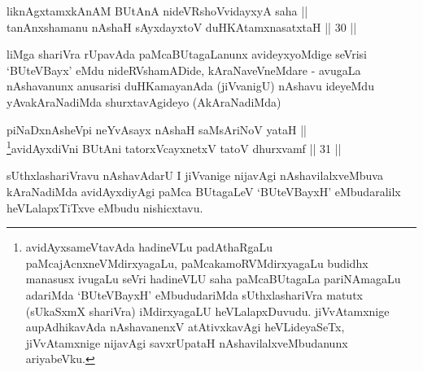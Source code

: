 
\begin{shl}
liknAgxtamxkAnAM BUtAnA nideVRshoV\s vidayxyA saha || \\
tanAnxshamanu nAshaH sAyxdayxtoV duHKAtamxnasatxtaH \hfill || 30 ||
  
\end{shl}

\begin{artha}
liMga shariVra rUpavAda paMcaBUtagaLanunx avideyxyoMdige seVrisi
`BUteVBayx' eMdu nideRVshamADide, kAraNaveVneMdare - avugaLa
nAshavanunx anusarisi duHKamayanAda (jiVvanigU) nAshavu ideyeMdu
yAvakAraNadiMda shurxtavAgideyo (AkAraNadiMda)
\end{artha}


\begin{shl}
piNaDxnAsheV\s pi neYvAsayx nAshaH saMsAriNoV yataH || \\
\footnote{avidAyxsameVtavAda hadineVLu padAthaRgaLu
paMcajAcnxneVMdirxyagaLu, paMcakamoRVMdirxyagaLu budidhx manasusx
ivugaLu seVri hadineVLU saha paMcaBUtagaLa pariNAmagaLu adariMda
`BUteVBayxH' eMbududariMda sUthxlashariVra matutx (sUkaSxmX
shariVra) iMdirxyagaLU heVLalapxDuvudu. jiVvAtamxnige aupAdhikavAda
nAshavanenxV atAtivxkavAgi heVLideyaSeTx, jiVvAtamxnige nijavAgi
savxrUpataH nAshavilalxveMbudanunx ariyabeVku.}avidAyxdiVni BUtAni tatorxVcayxnetxV tatoV dhurxvamf \hfill || 31 ||
  
\end{shl}


\begin{artha}
sUthxlashariVravu nAshavAdarU I jiVvanige nijavAgi
nAshavilalxveMbuva kAraNadiMda avidAyxdiyAgi paMca BUtagaLeV
`BUteVBayxH' eMbudaralilx heVLalapxTiTxve eMbudu nishicxtavu.
\end{artha}




